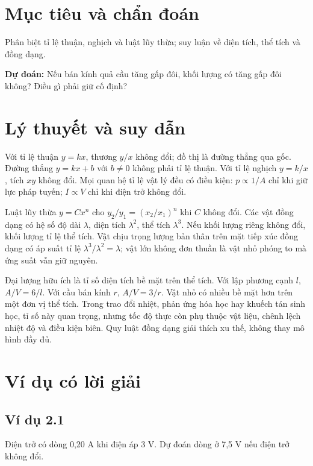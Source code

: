 \documentclass[11pt,a4paper,openany]{book}
\begin{document}
\section{Mục tiêu và chẩn đoán}
Phân biệt tỉ lệ thuận, nghịch và luật lũy thừa; suy luận về diện tích, thể tích và đồng dạng.

\textbf{Dự đoán:} Nếu bán kính quả cầu tăng gấp đôi, khối lượng có tăng gấp đôi không? Điều gì phải giữ cố định?
\section{Lý thuyết và suy dẫn}
Với tỉ lệ thuận $y=kx$, thương $y/x$ không đổi; đồ thị là đường thẳng qua gốc. Đường thẳng $y=kx+b$ với $b\ne0$ không phải tỉ lệ thuận. Với tỉ lệ nghịch $y=k/x$, tích $xy$ không đổi. Mọi quan hệ tỉ lệ vật lý đều có điều kiện: $p\propto1/A$ chỉ khi giữ lực pháp tuyến; $I\propto V$ chỉ khi điện trở không đổi.

Luật lũy thừa $y=Cx^n$ cho $y_2/y_1=(x_2/x_1)^n$ khi $C$ không đổi. Các vật đồng dạng có hệ số độ dài $\lambda$, diện tích $\lambda^2$, thể tích $\lambda^3$. Nếu khối lượng riêng không đổi, khối lượng tỉ lệ thể tích. Vật chịu trọng lượng bản thân trên mặt tiếp xúc đồng dạng có áp suất tỉ lệ $\lambda^3/\lambda^2=\lambda$; vật lớn không đơn thuần là vật nhỏ phóng to mà ứng suất vẫn giữ nguyên.

Đại lượng hữu ích là tỉ số diện tích bề mặt trên thể tích. Với lập phương cạnh $l$, $A/V=6/l$. Với cầu bán kính $r$, $A/V=3/r$. Vật nhỏ có nhiều bề mặt hơn trên một đơn vị thể tích. Trong trao đổi nhiệt, phản ứng hóa học hay khuếch tán sinh học, tỉ số này quan trọng, nhưng tốc độ thực còn phụ thuộc vật liệu, chênh lệch nhiệt độ và điều kiện biên. Quy luật đồng dạng giải thích xu thế, không thay mô hình đầy đủ.
\begin{center}
\end{center}
\section{Ví dụ có lời giải}
\subsection*{Ví dụ 2.1}
Điện trở có dòng 0,20 A khi điện áp 3 V. Dự đoán dòng ở 7,5 V nếu điện trở không đổi.
\end{document}

